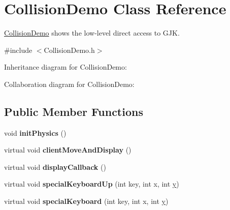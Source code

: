 \hypertarget{class_collision_demo}{\section{Collision\+Demo Class Reference}
\label{class_collision_demo}
}


\hyperlink{class_collision_demo}{Collision\+Demo} shows the low-\/level direct access to G\+J\+K.  




{\ttfamily \#include $<$Collision\+Demo.\+h$>$}



Inheritance diagram for Collision\+Demo\+:


Collaboration diagram for Collision\+Demo\+:
\subsection*{Public Member Functions}
\begin{DoxyCompactItemize}
\item 
\hypertarget{class_collision_demo_a0b67965f1d9944a751b19e9cabd1f37e}{void {\bfseries init\+Physics} ()}\label{class_collision_demo_a0b67965f1d9944a751b19e9cabd1f37e}

\item 
\hypertarget{class_collision_demo_ac4ab64ca0d5f44dd0ed6e626df57d590}{virtual void {\bfseries client\+Move\+And\+Display} ()}\label{class_collision_demo_ac4ab64ca0d5f44dd0ed6e626df57d590}

\item 
\hypertarget{class_collision_demo_a70b1edc3352c6a2f497895bcf35023b8}{virtual void {\bfseries display\+Callback} ()}\label{class_collision_demo_a70b1edc3352c6a2f497895bcf35023b8}

\item 
\hypertarget{class_collision_demo_a098303e4660f26414c87069220231ad8}{virtual void {\bfseries special\+Keyboard\+Up} (int key, int x, int \hyperlink{_ice_utils_8h_aa7ffaed69623192258fb8679569ff9ba}{y})}\label{class_collision_demo_a098303e4660f26414c87069220231ad8}

\item 
\hypertarget{class_collision_demo_a700a546ad5332bc18ea2f7109921908d}{virtual void {\bfseries special\+Keyboard} (int key, int x, int \hyperlink{_ice_utils_8h_aa7ffaed69623192258fb8679569ff9ba}{y})}\label{class_collision_demo_a700a546ad5332bc18ea2f7109921908d}

\end{DoxyCompactItemize}


